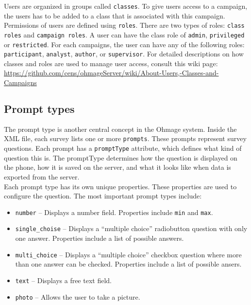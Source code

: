 \documentclass{scrartcl}
\begin{document}
Users are organized in groups called \texttt{classes}. To give users access to a
campaign, the users has to be added to a class that is associated with this
campaign.\\

Permissions of users are defined using \texttt{roles}. There are two types of
roles: \texttt{class roles} and \texttt{campaign roles}. A user can have the
class role of \texttt{admin}, \texttt{privileged} or \texttt{restricted}. 
For each campaigns, the user can have any of the following roles:
\texttt{participant}, \texttt{analyst}, \texttt{author}, or \texttt{supervisor}.
For detailed descriptions on how classes and roles are used to manage user
access, consult this wiki page:\\

\url{https://github.com/cens/ohmageServer/wiki/About-Users,-Classes-and-Campaigns}



\subsection{Prompt types}

The prompt type is another central concept in the Ohmage system. Inside the XML
file, each survey lists one or more \texttt{prompts}. These prompts represent
survey questions. Each prompt has a \texttt{promptType} attribute, which defines
what kind of question this is. The promptType determines how the question is
displayed on the phone, how it is saved on the server, and what it looks like
when data is exported from the server. \\

Each prompt type has its own unique properties. These properties are used to
configure the question. The most important prompt types include:

\begin{itemize}
  \item \texttt{number} -- Displays a number field. Properties include
  \texttt{min} and \texttt{max}.
  \item \texttt{single\_choise} -- Displays a ``multiple choice'' radiobutton
  question with only one answer. Properties include a list of possible answers.
  \item \texttt{multi\_choice} -- Displays a ``multiple choice'' checkbox
  question where more than one answer can be checked. Properties include a list of
  possible ansers.
  \item \texttt{text} -- Displays a free text field.
  \item \texttt{photo} -- Allows the user to take a picture.
\end{itemize}
\end{document}
